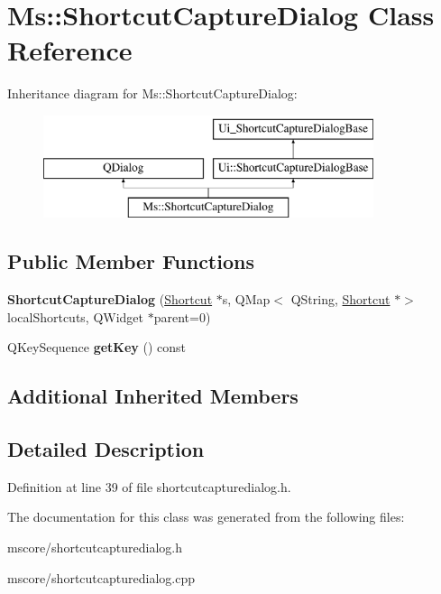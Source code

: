 \hypertarget{class_ms_1_1_shortcut_capture_dialog}{}\section{Ms\+:\+:Shortcut\+Capture\+Dialog Class Reference}
\label{class_ms_1_1_shortcut_capture_dialog}
Inheritance diagram for Ms\+:\+:Shortcut\+Capture\+Dialog\+:\begin{figure}[H]
\begin{center}
\leavevmode
\includegraphics[height=3.000000cm]{class_ms_1_1_shortcut_capture_dialog}
\end{center}
\end{figure}
\subsection*{Public Member Functions}
\begin{DoxyCompactItemize}
\item 
\mbox{\label{class_ms_1_1_shortcut_capture_dialog_ace5e48af40c0b30911822e426d9ae3ed}} 
{\bfseries Shortcut\+Capture\+Dialog} (\hyperlink{class_ms_1_1_shortcut}{Shortcut} $\ast$s, Q\+Map$<$ Q\+String, \hyperlink{class_ms_1_1_shortcut}{Shortcut} $\ast$$>$ local\+Shortcuts, Q\+Widget $\ast$parent=0)
\item 
\mbox{\label{class_ms_1_1_shortcut_capture_dialog_a85a26dd1124bd39b15a1972073d950de}} 
Q\+Key\+Sequence {\bfseries get\+Key} () const
\end{DoxyCompactItemize}
\subsection*{Additional Inherited Members}


\subsection{Detailed Description}


Definition at line 39 of file shortcutcapturedialog.\+h.



The documentation for this class was generated from the following files\+:\begin{DoxyCompactItemize}
\item 
mscore/shortcutcapturedialog.\+h\item 
mscore/shortcutcapturedialog.\+cpp\end{DoxyCompactItemize}
